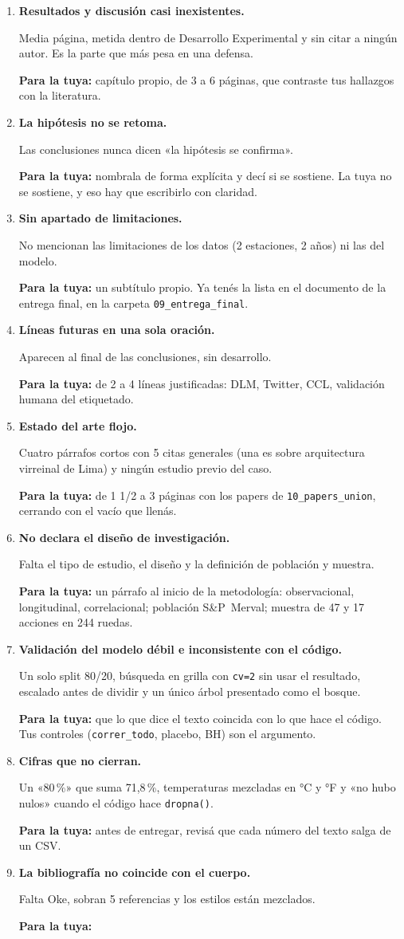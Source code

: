 \documentclass[12pt,a4paper,oneside]{report}
\newcommand{\cod}[1]{\texttt{\small #1}}
\begin{document}
\newcommand{\falta}[3]{\item \textbf{#1}\par #2\par\noindent\textcolor{alerta}{\textbf{Para la tuya:}} #3}

\begin{enumerate}[label=\textbf{\arabic*.},leftmargin=*,itemsep=8pt]
  \falta{Resultados y discusión casi inexistentes.}
    {Media página, metida dentro de Desarrollo Experimental y sin citar a ningún autor.
    Es la parte que más pesa en una defensa.}
    {capítulo propio, de 3 a 6 páginas, que contraste tus hallazgos con la literatura.}
  \falta{La hipótesis no se retoma.}
    {Las conclusiones nunca dicen «la hipótesis se confirma».}
    {nombrala de forma explícita y decí si se sostiene. La tuya no se sostiene, y eso
    hay que escribirlo con claridad.}
  \falta{Sin apartado de limitaciones.}
    {No mencionan las limitaciones de los datos (2 estaciones, 2 años) ni las del
    modelo.}
    {un subtítulo propio. Ya tenés la lista en el documento de la entrega final, en la
    carpeta \cod{09\_entrega\_final}.}
  \falta{Líneas futuras en una sola oración.}
    {Aparecen al final de las conclusiones, sin desarrollo.}
    {de 2 a 4 líneas justificadas: DLM, Twitter, CCL, validación humana del etiquetado.}
  \falta{Estado del arte flojo.}
    {Cuatro párrafos cortos con 5 citas generales (una es sobre arquitectura virreinal
    de Lima) y ningún estudio previo del caso.}
    {de 1 1/2 a 3 páginas con los papers de \cod{10\_papers\_union}, cerrando con el
    vacío que llenás.}
  \falta{No declara el diseño de investigación.}
    {Falta el tipo de estudio, el diseño y la definición de población y muestra.}
    {un párrafo al inicio de la metodología: observacional, longitudinal, correlacional;
    población S\&P~Merval; muestra de 47 y 17 acciones en 244 ruedas.}
  \falta{Validación del modelo débil e inconsistente con el código.}
    {Un solo split 80/20, búsqueda en grilla con \cod{cv=2} sin usar el resultado,
    escalado antes de dividir y un único árbol presentado como el bosque.}
    {que lo que dice el texto coincida con lo que hace el código. Tus controles
    (\cod{correr\_todo}, placebo, BH) son el argumento.}
  \falta{Cifras que no cierran.}
    {Un «80\,\%» que suma 71,8\,\%, temperaturas mezcladas en °C y °F y «no hubo nulos»
    cuando el código hace \cod{dropna()}.}
    {antes de entregar, revisá que cada número del texto salga de un CSV.}
  \falta{La bibliografía no coincide con el cuerpo.}
    {Falta Oke, sobran 5 referencias y los estilos están mezclados.}

\end{enumerate}
\end{document}
